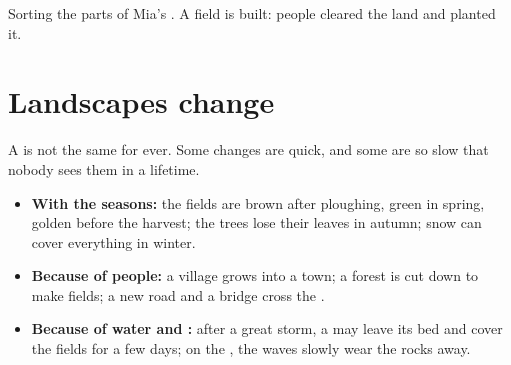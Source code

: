 \begin{omfigure}

{\small Sorting the parts of Mia's . A field is built: people
cleared the land and planted it.}
\label{fig:g1:landscapes-around-us:sort}
\end{omfigure}

\section{Landscapes change}

A  is not the same for ever. Some changes are quick, and some are
so slow that nobody sees them in a lifetime.
\begin{itemize}
  \item \textbf{With the seasons:} the fields are brown after ploughing,
        green in spring, golden before the harvest; the trees lose their
        leaves in autumn; snow can cover everything in winter.
  \item \textbf{Because of people:} a village grows into a town; a forest
        is cut down to make fields; a new road and a bridge cross the
        .
  \item \textbf{Because of water and :} after a great storm, a 
        may leave its bed and cover the fields for a few days; on the
        , the waves slowly wear the rocks away.
\end{itemize}

